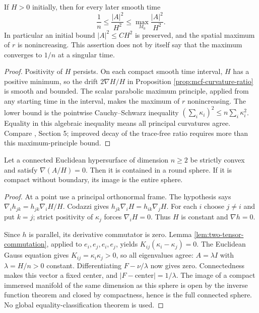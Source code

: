\begin{corollary}\label{cor:mcf-ratio-bound}
If $H>0$ initially, then for every later smooth time
\[
 \frac1n\leq\frac{|A|^2}{H^2}\leq\max_{M_0}\frac{|A|^2}{H^2}.
\]
In particular an initial bound $|A|^2\leq CH^2$ is preserved, and the spatial maximum of $r$ is nonincreasing. This assertion does not by itself say that the maximum converges to $1/n$ at a singular time.
\end{corollary}
\begin{proof}
Positivity of $H$ persists. On each compact smooth time interval, $H$ has a positive minimum, so the drift $2\nabla H/H$ in Proposition \ref{prop:mcf-curvature-ratio} is smooth and bounded. The scalar parabolic maximum principle, applied from any starting time in the interval, makes the maximum of $r$ nonincreasing. The lower bound is the pointwise Cauchy--Schwarz inequality $(\sum_i\kappa_i)^2\leq n\sum_i\kappa_i^2$. Equality in this algebraic inequality means all principal curvatures agree. Compare \cite{Hui84}, Section 5; improved decay of the trace-free ratio requires more than this maximum-principle bound.
\end{proof}

\begin{lemma}\label{lem:parallel-normalized-shape}
Let a connected Euclidean hypersurface of dimension $n\geq2$ be strictly convex and satisfy $\nabla(A/H)=0$. Then it is contained in a round sphere. If it is compact without boundary, its image is the entire sphere.
\end{lemma}
\begin{proof}
At a point use a principal orthonormal frame. The hypothesis says $\nabla_i h_{jk}=h_{jk}\nabla_iH/H$. Codazzi gives
$h_{jk}\nabla_iH=h_{ik}\nabla_jH$. For each $i$ choose $j\ne i$ and put $k=j$; strict positivity of $\kappa_j$ forces $\nabla_iH=0$. Thus $H$ is constant and $\nabla h=0$.

Since $h$ is parallel, its derivative commutator is zero. Lemma \ref{lem:two-tensor-commutation}, applied to $e_i,e_j,e_i,e_j$, yields $K_{ij}(\kappa_i-\kappa_j)=0$. The Euclidean Gauss equation gives $K_{ij}=\kappa_i\kappa_j>0$, so all eigenvalues agree: $A=\lambda I$ with $\lambda=H/n>0$ constant. Differentiating $F-\nu/\lambda$ now gives zero. Connectedness makes this vector a fixed center, and $|F-\text{center}|=1/\lambda$. The image of a compact immersed manifold of the same dimension as this sphere is open by the inverse function theorem and closed by compactness, hence is the full connected sphere. No global equality-classification theorem is used.
\end{proof}

